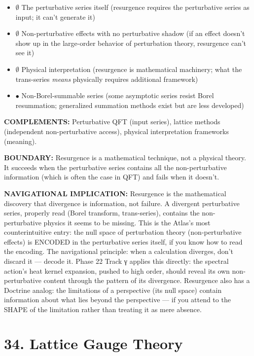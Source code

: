 \begin{itemize}[nosep,leftmargin=*]
  \item $\emptyset$ The perturbative series itself (resurgence requires the perturbative series as input; it can't generate it)
  \item $\emptyset$ Non-perturbative effects with no perturbative shadow (if an effect doesn't show up in the large-order behavior of perturbation theory, resurgence can't see it)
  \item $\emptyset$ Physical interpretation (resurgence is mathematical machinery; what the trans-series \textit{means} physically requires additional framework)
  \item $\bullet$ Non-Borel-summable series (some asymptotic series resist Borel resummation; generalized summation methods exist but are less developed)
\end{itemize}


\textbf{COMPLEMENTS:} Perturbative QFT (input series), lattice methods (independent non-perturbative access), physical interpretation frameworks (meaning).


\textbf{BOUNDARY:} Resurgence is a mathematical technique, not a physical theory. It succeeds when the perturbative series contains all the non-perturbative information (which is often the case in QFT) and fails when it doesn't.


\textbf{NAVIGATIONAL IMPLICATION:} Resurgence is the mathematical discovery that divergence is information, not failure. A divergent perturbative series, properly read (Borel transform, trans-series), contains the non-perturbative physics it seems to be missing. This is the Atlas's most counterintuitive entry: the null space of perturbation theory (non-perturbative effects) is ENCODED in the perturbative series itself, if you know how to read the encoding. The navigational principle: when a calculation diverges, don't discard it — decode it. Phase 22 Track γ applies this directly: the spectral action's heat kernel expansion, pushed to high order, should reveal its own non-perturbative content through the pattern of its divergence. Resurgence also has a Doctrine analog: the limitations of a perspective (its null space) contain information about what lies beyond the perspective — if you attend to the SHAPE of the limitation rather than treating it as mere absence.


\bigskip\noindent\makebox[\textwidth]{\color{rulegray}\rule{5cm}{0.3pt}}\bigskip


\section*{34. Lattice Gauge Theory}


